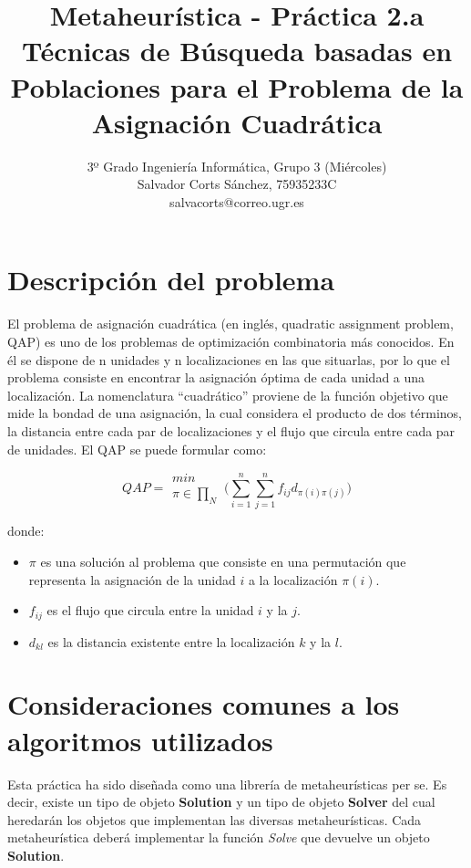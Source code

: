 \documentclass[a4paper, 12pt]{article}
\title{
\textbf{Metaheurística - Práctica 2.a} \\
Técnicas de Búsqueda basadas en Poblaciones para el Problema de la Asignación Cuadrática
}
\author{
3º Grado Ingeniería Informática, Grupo 3 (Miércoles)\\
Salvador Corts Sánchez, 75935233C \\
salvacorts@correo.ugr.es
}
\date{}
\begin{document}
   \maketitle
   
   \newpage
   \tableofcontents

   
   \newpage
   \section{Descripción del problema}
   El problema de asignación cuadrática (en inglés, quadratic assignment problem, QAP) es uno de los problemas de optimización combinatoria más conocidos. En él se dispone de n unidades y n localizaciones en las que situarlas, por lo que el problema consiste en encontrar la asignación óptima de cada unidad a una localización. La nomenclatura “cuadrático” proviene de la función objetivo que mide la bondad de una asignación, la cual considera el producto de dos términos, la distancia entre cada par de localizaciones y el flujo que circula entre cada par de unidades. El QAP se puede formular como:
   
   $$QAP = 
\begin{matrix}
min\\
\pi \in \prod_N 
\end{matrix}   \Bigg( \sum_{i=1}^{n} \sum_{j=1}^{n} f_{ij}d_{\pi(i)\pi(j)} \Bigg)   
   $$
   
   donde:
   \begin{itemize}
      \item \textbf{$\pi$} es una solución al problema que consiste en una permutación que representa la asignación de la unidad $i$ a la localización  $\pi(i)$.
      
      \item $f_{ij}$ es el flujo que circula entre la unidad $i$ y la $j$.
      
      \item $d_{kl}$ es la distancia existente entre la localización $k$ y la $l$.
   \end{itemize}
   
   
   \newpage
   \section{Consideraciones comunes a los algoritmos utilizados}
   Esta práctica ha sido diseñada como una librería de metaheurísticas per se. Es decir, existe un tipo de objeto \textbf{Solution} y un tipo de objeto \textbf{Solver} del cual heredarán los objetos que implementan las diversas metaheurísticas. Cada metaheurística deberá implementar la función \textit{Solve} que devuelve un objeto \textbf{Solution}.
   
\end{document}
